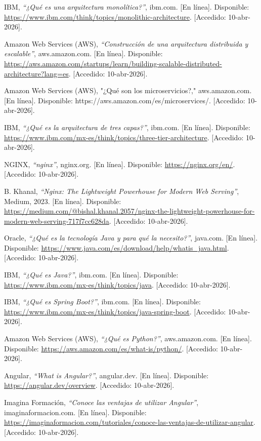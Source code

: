 IBM, \textit{``¿Qué es una arquitectura monolítica?''}, ibm.com. [En línea]. Disponible: \url{https://www.ibm.com/think/topics/monolithic-architecture}. [Accedido: 10-abr-2026].

Amazon Web Services (AWS), \textit{``Construcción de una arquitectura distribuida y escalable''}, aws.amazon.com. [En línea]. Disponible: \url{https://aws.amazon.com/startups/learn/building-scalable-distributed-architecture?lang=es}. [Accedido: 10-abr-2026].

Amazon Web Services (AWS), "¿Qué son los microservicios?," aws.amazon.com. [En línea]. Disponible: https://aws.amazon.com/es/microservices/. [Accedido: 10-abr-2026].

IBM, \textit{``¿Qué es la arquitectura de tres capas?''}, ibm.com. [En línea]. Disponible: \url{https://www.ibm.com/mx-es/think/topics/three-tier-architecture}. [Accedido: 10-abr-2026].

NGINX, \textit{``nginx''}, nginx.org. [En línea]. Disponible: \url{https://nginx.org/en/}. [Accedido: 10-abr-2026].

B. Khanal, \textit{``Nginx: The Lightweight Powerhouse for Modern Web Serving''}, Medium, 2023. [En línea]. Disponible: \url{https://medium.com/@bishal.khanal.2057/nginx-the-lightweight-powerhouse-for-modern-web-serving-717f7cc628da}. [Accedido: 10-abr-2026].

Oracle, \textit{``¿Qué es la tecnología Java y para qué la necesito?''}, java.com. [En línea]. Disponible: \url{https://www.java.com/es/download/help/whatis_java.html}. [Accedido: 10-abr-2026].

IBM, \textit{``¿Qué es Java?''}, ibm.com. [En línea]. Disponible: \url{https://www.ibm.com/mx-es/think/topics/java}. [Accedido: 10-abr-2026].

IBM, \textit{``¿Qué es Spring Boot?''}, ibm.com. [En línea]. Disponible: \url{https://www.ibm.com/mx-es/think/topics/java-spring-boot}. [Accedido: 10-abr-2026].

Amazon Web Services (AWS), \textit{``¿Qué es Python?''}, aws.amazon.com. [En línea]. Disponible: \url{https://aws.amazon.com/es/what-is/python/}. [Accedido: 10-abr-2026].

Angular, \textit{``What is Angular?''}, angular.dev. [En línea]. Disponible: \url{https://angular.dev/overview}. [Accedido: 10-abr-2026].

Imagina Formación, \textit{``Conoce las ventajas de utilizar Angular''}, imaginaformacion.com. [En línea]. Disponible: \url{https://imaginaformacion.com/tutoriales/conoce-las-ventajas-de-utilizar-angular}. [Accedido: 10-abr-2026].

